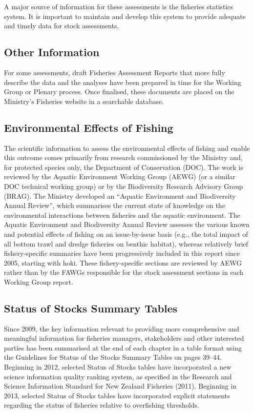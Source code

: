 \documentclass{mpi-plenary}
\theoremstyle{definition}
\theoremstyle{definition}
\theoremstyle{definition}
\theoremstyle{remark}
\begin{document}
A major source of information for these assessments is the fisheries
statistics system. It is important to maintain and develop this system
to provide adequate and timely data for stock assessments.

\subsection{Other Information}\label{other-information}

For some assessments, draft Fisheries Assessment Reports that more fully
describe the data and the analyses have been prepared in time for the
Working Group or Plenary process. Once finalised, these documents are
placed on the Ministry's Fisheries website in a searchable database.

\subsection{Environmental Effects of
Fishing}\label{environmental-effects-of-fishing}

The scientific information to assess the environmental effects of
fishing and enable this outcome comes primarily from research
commissioned by the Ministry and, for protected species only, the
Department of Conservation (DOC). The work is reviewed by the Aquatic
Environment Working Group (AEWG) (or a similar DOC technical working
group) or by the Biodiversity Research Advisory Group (BRAG). The
Ministry developed an ``Aquatic Environment and Biodiversity Annual
Review'', which summarises the current state of knowledge on the
environmental interactions between fisheries and the aquatic
environment. The Aquatic Environment and Biodiversity Annual Review
assesses the various known and potential effects of fishing on an
issue-by-issue basis (e.g., the total impact of all bottom trawl and
dredge fisheries on benthic habitat), whereas relatively brief
fishery-specific summaries have been progressively included in this
report since 2005, starting with hoki. These fishery-specific sections
are reviewed by AEWG rather than by the FAWGs responsible for the stock
assessment sections in each Working Group report.

\subsection{Status of Stocks Summary
Tables}\label{status-of-stocks-summary-tables}

Since 2009, the key information relevant to providing more comprehensive
and meaningful information for fisheries managers, stakeholders and
other interested parties has been summarised at the end of each chapter
in a table format using the Guidelines for Status of the Stocks Summary
Tables on pages 39--44. Beginning in 2012, selected Status of Stocks
tables have incorporated a new science information quality ranking
system, as specified in the Research and Science Information Standard
for New Zealand Fisheries (2011). Beginning in 2013, selected Status of
Stocks tables have incorporated explicit statements regarding the status
of fisheries relative to overfishing thresholds.
\end{document}
